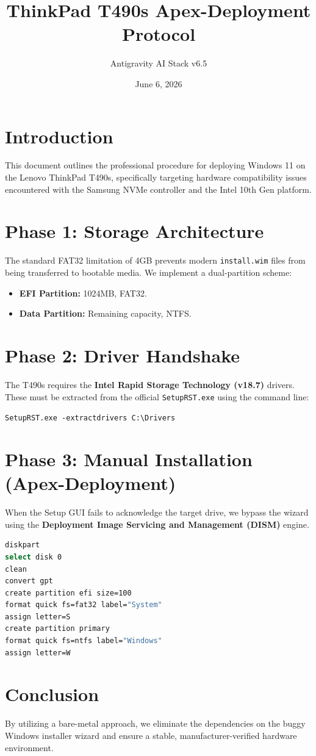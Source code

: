 \documentclass[12pt,a4paper]{article}
\title{\textbf{ThinkPad T490s Apex-Deployment Protocol}}
\author{Antigravity AI Stack v6.5}
\date{June 6, 2026}
\begin{document}
\maketitle

\section{Introduction}
This document outlines the professional procedure for deploying Windows 11 on the Lenovo ThinkPad T490s, specifically targeting hardware compatibility issues encountered with the Samsung NVMe controller and the Intel 10th Gen platform.

\section{Phase 1: Storage Architecture}
The standard FAT32 limitation of 4GB prevents modern \texttt{install.wim} files from being transferred to bootable media. We implement a dual-partition scheme:
\begin{itemize}
    \item \textbf{EFI Partition:} 1024MB, FAT32.
    \item \textbf{Data Partition:} Remaining capacity, NTFS.
\end{itemize}

\section{Phase 2: Driver Handshake}
The T490s requires the \textbf{Intel Rapid Storage Technology (v18.7)} drivers. These must be extracted from the official \texttt{SetupRST.exe} using the command line:
\begin{center}
    \texttt{SetupRST.exe -extractdrivers C:\textbackslash Drivers}
\end{center}

\section{Phase 3: Manual Installation (Apex-Deployment)}
When the Setup GUI fails to acknowledge the target drive, we bypass the wizard using the \textbf{Deployment Image Servicing and Management (DISM)} engine.

\begin{lstlisting}[language=bash, caption=Diskpart Configuration]
diskpart
select disk 0
clean
convert gpt
create partition efi size=100
format quick fs=fat32 label="System"
assign letter=S
create partition primary
format quick fs=ntfs label="Windows"
assign letter=W
\end{lstlisting}

\section{Conclusion}
By utilizing a bare-metal approach, we eliminate the dependencies on the buggy Windows installer wizard and ensure a stable, manufacturer-verified hardware environment.
\end{document}
